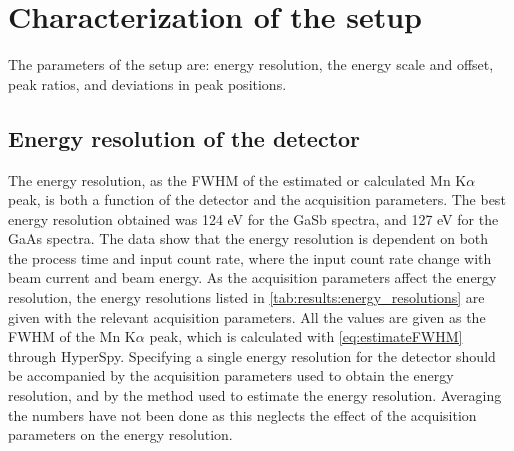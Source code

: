




























\section{Characterization of the setup}
\label{results:setup}

The parameters of the setup are: energy resolution, the energy scale and offset, peak ratios, and deviations in peak positions.



\subsection*{Energy resolution of the detector}
\label{results:setup:energy_resolution}

The energy resolution, as the FWHM of the estimated or calculated Mn K$\alpha$ peak, is both a function of the detector and the acquisition parameters.
The best energy resolution obtained was 124 eV for the GaSb spectra, and 127 eV for the GaAs spectra.
The data show that the energy resolution is dependent on both the process time and input count rate, where the input count rate change with beam current and beam energy.
As the acquisition parameters affect the energy resolution, the energy resolutions listed in \cref{tab:results:energy_resolutions} are given with the relevant acquisition parameters.
All the values are given as the FWHM of the Mn K$\alpha$ peak, which is calculated with \cref{eq:estimateFWHM} through HyperSpy.
Specifying a single energy resolution for the detector should be accompanied by the acquisition parameters used to obtain the energy resolution, and by the method used to estimate the energy resolution.
Averaging the numbers have not been done as this neglects the effect of the acquisition parameters on the energy resolution.


